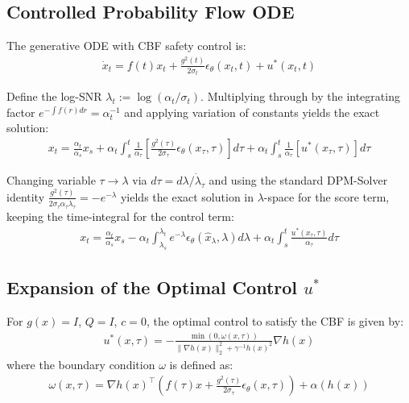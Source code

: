 \documentclass{article}
\begin{document}
\subsection{Controlled Probability Flow ODE}

The generative ODE with CBF safety control is:
\begin{align}
\dot{x}_t = f(t)x_t + \frac{g^2(t)}{2\sigma_t}\epsilon_\theta(x_t,t) + u^*(x_t,t)
\end{align}

Define the log-SNR $\lambda_t := \log(\alpha_t/\sigma_t)$. Multiplying through by the integrating factor $e^{-\int f(r)dr} = \alpha_t^{-1}$ and applying variation of constants yields the exact solution:
\begin{align}
x_t = \frac{\alpha_t}{\alpha_s}x_s + \alpha_t\int_s^t \frac{1}{\alpha_\tau}\left[\frac{g^2(\tau)}{2\sigma_\tau}\epsilon_\theta(x_\tau,\tau)\right]d\tau + \alpha_t\int_s^t \frac{1}{\alpha_\tau}\left[ u^*(x_\tau,\tau)\right]d\tau
\end{align}

Changing variable $\tau \to \lambda$ via $d\tau = d\lambda/\dot{\lambda}_\tau$ and using the standard DPM-Solver identity $\frac{g^2(\tau)}{2\sigma_\tau\alpha_\tau\dot{\lambda}_\tau} = -e^{-\lambda}$ yields the exact solution in $\lambda$-space for the score term, keeping the time-integral for the control term:
\begin{align}
x_t = \frac{\alpha_t}{\alpha_s}x_s - \alpha_t\int_{\lambda_s}^{\lambda_t} e^{-\lambda}\epsilon_\theta(\hat{x}_\lambda,\lambda)d\lambda + \alpha_t\int_{s}^{t} \frac{u^*(x_\tau,\tau)}{\alpha_\tau}d\tau
\end{align}

\subsection{Expansion of the Optimal Control $u^*$}

For $g(x) = I$, $Q = I$, $c = 0$, the optimal control to satisfy the CBF is given by:
\begin{align}
u^*(x,\tau) = -\frac{\min(0,\omega(x,\tau))}{\|\nabla h(x)\|_2^2 + \gamma^{-1}h(x)^2}\nabla h(x)
\end{align}
where the boundary condition $\omega$ is defined as:
\begin{align}
\omega(x,\tau) = \nabla h(x)^\top\!\left(f(\tau)x + \frac{g^2(\tau)}{2\sigma_\tau}\epsilon_\theta(x,\tau)\right) + \alpha(h(x))
\end{align}
\end{document}
